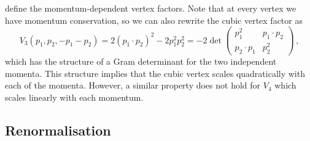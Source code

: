 \documentclass[a4paper,11pt]{article}
\def\sdot{\!\cdot\!}
\begin{document}
define the momentum-dependent vertex factors. Note that at every vertex we have momentum conservation, so we can also rewrite the cubic vertex factor as 
\begin{equation}\label{eq:V3_Gram}
    V_3(p_1,p_2,-p_1-p_2) = 2(p_1 \sdot p_2)^2 - 2p_1^2p_2^2 = -2\det\begin{pmatrix} p_1^2 & p_1\sdot p_2 \\ p_2\sdot p_1 & p_2^2 \end{pmatrix} \,,
\end{equation}
which has the structure of a Gram determinant for the two independent momenta. This structure implies that the cubic vertex scales quadratically with each of the momenta. However, a similar property does not hold for $V_4$ which scales linearly with each momentum.



\subsection{Renormalisation}\label{sec:Rernormalisation}
\end{document}
